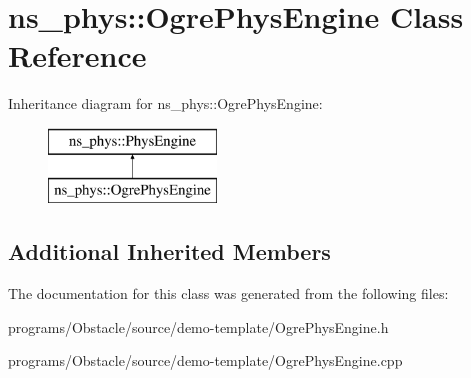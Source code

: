 \hypertarget{classns__phys_1_1_ogre_phys_engine}{}\section{ns\+\_\+phys\+:\+:Ogre\+Phys\+Engine Class Reference}
\label{classns__phys_1_1_ogre_phys_engine}
Inheritance diagram for ns\+\_\+phys\+:\+:Ogre\+Phys\+Engine\+:\begin{figure}[H]
\begin{center}
\leavevmode
\includegraphics[height=2.000000cm]{classns__phys_1_1_ogre_phys_engine}
\end{center}
\end{figure}
\subsection*{Additional Inherited Members}


The documentation for this class was generated from the following files\+:\begin{DoxyCompactItemize}
\item 
programs/\+Obstacle/source/demo-\/template/Ogre\+Phys\+Engine.\+h\item 
programs/\+Obstacle/source/demo-\/template/Ogre\+Phys\+Engine.\+cpp\end{DoxyCompactItemize}
